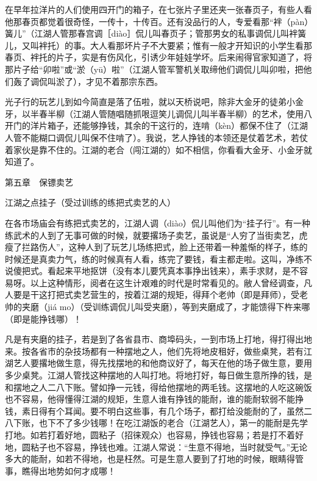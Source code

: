 \documentclass[12pt,UTF8]{ctexbook}
\begin{document}
在早年拉洋片的人们使用四开门的箱子，在七张片子里还夹一张春页子，有些人看他那春页都觉着很奇怪，一传十，十传百。还有没品行的人，专爱看那“袢（pàn）簧儿”（江湖人管那春宫调［diào］侃儿叫春页子；管那男女的私事调侃儿叫袢簧儿，又叫袢托）的事。大人看那坏片子不大要紧；惟有一般才开知识的小学生看那春页、袢托的片子，实是有伤风化，引诱少年娃娃学坏。后来闹得官家知道了，将那片子给“卯啦”或“淤（yū）啦”（江湖人管军警机关取缔他们调侃儿叫卯啦，把他们轰了调侃叫淤了），才见不着那宗东西。

光子行的玩艺儿到如今简直是落了伍啦，就以天桥说吧，除非大金牙的徒弟小金牙，以半春半柳（江湖人管随唱随抓哏逗笑儿调侃儿叫半春半柳）的艺术，使用八开门的洋片箱子，还能够挣钱，其余的干这行的，连啃（kèn）都保不住了（江湖人管不能糊口调侃儿叫保不住啃了）。我说，艺人挣钱的本领还是仗着艺术，若仗着家伙是靠不住的。江湖的老合（闯江湖的）如不相信，你看看大金牙、小金牙就知道了。





第五章　保镖卖艺


江湖之点挂子（受过训练的练把式卖艺的人）


在各市场庙会有练把式卖艺的，江湖人调（diào）侃儿叫他们为“挂子行”。有一种练武术的人到了无事可做的时候，就要撂场子卖艺，虽说是“人穷了当街卖艺，虎瘦了拦路伤人”，这种人到了玩艺儿场练把式，脸上还带着一种羞惭的样子，练的时候还是真卖力气，练的时候真有人看，练完了要钱，看主都走啦。这叫，净练不说傻把式。看起来平地抠饼（没有本儿要凭真本事挣出钱来），素手求财，是不容易呀。以上这种情形，阅者在这生计艰难的时代是时常看见的。敝人曾经调查，凡人要是干这打把式卖艺营生的，按着江湖的规矩，得拜个老帅（即是拜师），受老帅的夹磨（jiá mo）（受训练调侃儿叫受夹磨），等到夹磨成了，才能馈得下杵来哪（即是能挣钱哪）！

凡是有夹磨的挂子，若是到了各省县市、商埠码头，一到市场上打地，得打得出地来。按各省市的杂技场都有一种摆地之人，他们先将地皮租好，做些桌凳，若有江湖艺人要撂地做生意，得先找摆地的和他商议好了，每天在他的场子做生意，要用多少桌凳。江湖人管找这种摆地的人叫打地。将地打好，每日做生意所挣的钱，是和摆地之人二八下账。譬如挣一元钱，得给他摆地的两毛钱。这摆地的人吃这碗饭也不容易，他得懂得江湖的规矩，生意人谁有挣钱的能耐，谁的能耐软弱不能挣钱，素日得有个耳闻。要不明白这些事，有几个场子，都打给没能耐的了，虽然二八下账，也下不了多少钱哪！在吃江湖饭的老合（江湖艺人），第一的能耐是先学打地。如若打着好地，圆粘子（招徕观众）也容易，挣钱也容易；若是打不着好地，圆粘子也不容易，挣钱也难。江湖人常说：“生意不得地，当时就受气。”无论多大的能耐，如若不得地，也是枉然。可是生意人要到了打地的时候，眼睛得管事，瞧得出地势如何才成哪！
\end{document}
